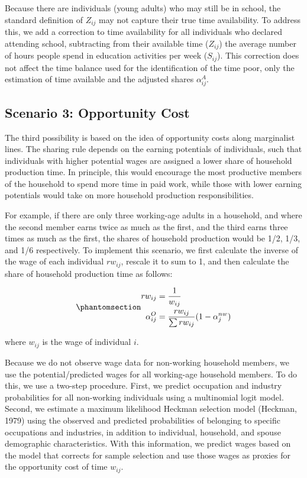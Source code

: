 \documentclass[
  11pt,
]{article}
\begin{document}
Because there are individuals (young adults) who may still be in school,
the standard definition of \(Z_{ij}\) may not capture their true time
availability. To address this, we add a correction to time availability
for all individuals who declared attending school, subtracting from
their available time (\(Z_{ij}\)) the average number of hours people
spend in education activities per week (\(S_{ij}\)). This correction
does not affect the time balance used for the identification of the time
poor, only the estimation of time available and the adjusted shares
\(\alpha_{ij}^A\).

\subsection{Scenario 3: Opportunity
Cost}\label{scenario-3-opportunity-cost}

The third possibility is based on the idea of opportunity costs along
marginalist lines. The sharing rule depends on the earning potentials of
individuals, such that individuals with higher potential wages are
assigned a lower share of household production time. In principle, this
would encourage the most productive members of the household to spend
more time in paid work, while those with lower earning potentials would
take on more household production responsibilities.

For example, if there are only three working-age adults in a household,
and where the second member earns twice as much as the first, and the
third earns three times as much as the first, the shares of household
production would be 1/2, 1/3, and 1/6 respectively. To implement this
scenario, we first calculate the inverse of the wage of each individual
\(rw_{ij}\), rescale it to sum to 1, and then calculate the share of
household production time as follows:

\begin{equation}\phantomsection\label{eq-r3}{\begin{aligned}
rw_{ij} &= \frac{1}{w_{ij}} \\
\alpha_{ij}^O &= \frac{rw_{ij}}{\sum rw_{ij}} (1-\alpha_{j}^{nw})
\end{aligned}
}\end{equation}

where \(w_{ij}\) is the wage of individual \(i\).

Because we do not observe wage data for non-working household members,
we use the potential/predicted wages for all working-age household
members. To do this, we use a two-step procedure. First, we predict
occupation and industry probabilities for all non-working individuals
using a multinomial logit model. Second, we estimate a maximum
likelihood Heckman selection model (Heckman, 1979) using the observed
and predicted probabilities of belonging to specific occupations and
industries, in addition to individual, household, and spouse demographic
characteristics. With this information, we predict wages based on the
model that corrects for sample selection and use those wages as proxies
for the opportunity cost of time \(w_{ij}\).
\end{document}
